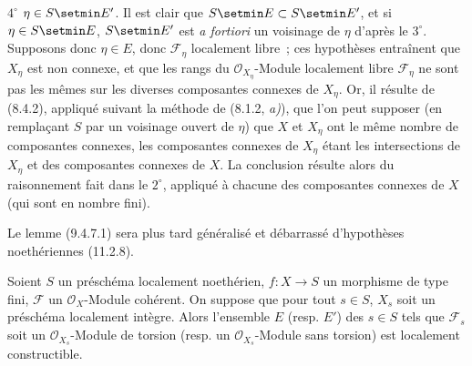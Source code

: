 $4^\circ$ $\eta\in S\setmin E'$. Il est clair que $S\setmin E\subset S\setmin E'$, et si
$\eta\in S\setmin E$, $S\setmin E'$ est \emph{a fortiori} un voisinage de $\eta$ d'après le
$3^\circ$. Supposons donc $\eta\in E$, donc $\mathcal F_\eta$ localement
libre~; ces hypothèses entraînent que $X_\eta$ est non connexe, et que les
rangs du $\mathcal O_{X_\eta}$-Module localement libre $\mathcal F_\eta$ ne
sont pas les mêmes sur les diverses composantes connexes de $X_\eta$. Or, il
résulte de (8.4.2), appliqué suivant la méthode de (8.1.2, \emph{a)}), que l'on
peut supposer (en remplaçant $S$ par un voisinage ouvert de $\eta$) que $X$ et
$X_\eta$ ont le même nombre de composantes connexes, les composantes connexes
de $X_\eta$ étant les intersections de $X_\eta$ et des composantes connexes de
$X$. La conclusion résulte alors du raisonnement fait dans le $2^\circ$,
appliqué à chacune des composantes connexes de $X$ (qui sont en nombre fini).

\begin{remark}[9.4.7.2]
\label{IV.9.4.7.2-fr}
Le lemme (9.4.7.1) sera plus tard généralisé et débarrassé d'hypothèses
noethériennes (11.2.8).
\end{remark}

\begin{proposition}[9.4.8]
\label{IV.9.4.8-fr}
Soient $S$ un préschéma localement noethérien, $f:X\to S$ un morphisme de type
fini, $\mathcal F$ un $\mathcal O_X$-Module cohérent. On suppose que pour tout
$s\in S$, $X_s$ soit un préschéma localement intègre. Alors l'ensemble $E$
\textnormal{(resp.} $E'$\textnormal{)} des $s\in S$ tels que $\mathcal F_s$
soit un $\mathcal O_{X_s}$-Module de torsion \textnormal{(resp.} un
$\mathcal O_{X_s}$-Module sans torsion\textnormal{)} est localement
constructible.
\end{proposition}

